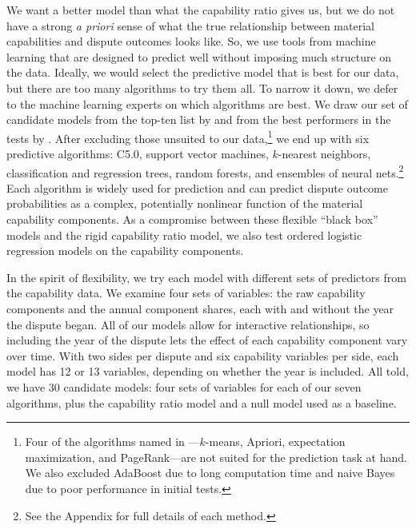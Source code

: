 We want a better model than what the capability ratio gives us, but we do not have a strong \emph{a priori} sense of what the true relationship between material capabilities and dispute outcomes looks like.
So, we use tools from machine learning that are designed to predict well without imposing much structure on the data.
Ideally, we would select the predictive model that is best for our data, but there are too many algorithms to try them all.
To narrow it down, we defer to the machine learning experts on which algorithms are best.
We draw our set of candidate models from the top-ten list by \citet{Wu:2007ev} and from the best performers in the tests by \citet{FernandezDelgado:2014ul}.
After excluding those unsuited to our data,\footnote{%
  Four of the algorithms named in \citet{Wu:2007ev}---$k$-means, Apriori, expectation maximization, and PageRank---are not suited for the prediction task at hand.
  We also excluded AdaBoost due to long computation time and naive Bayes due to poor performance in initial tests.
}
we end up with six predictive algorithms: C5.0, support vector machines, $k$-nearest neighbors, classification and regression trees, random forests, and ensembles of neural nets.\footnote{%
  See the Appendix for full details of each method.
}
Each algorithm is widely used for prediction and can predict dispute outcome probabilities as a complex, potentially nonlinear function of the material capability components.
As a compromise between these flexible ``black box'' models and the rigid capability ratio model, we also test ordered logistic regression models on the capability components.

In the spirit of flexibility, we try each model with different sets of predictors from the capability data.
We examine four sets of variables: the raw capability components and the annual component shares, each with and without the year the dispute began.
All of our models allow for interactive relationships, so including the year of
the dispute lets the effect of each capability component vary over time.
With two sides per dispute and six capability variables per side, each model has 12 or 13 variables, depending on whether the year is included.
All told, we have 30 candidate models: four sets of variables for each of our seven algorithms, plus the capability ratio model and a null model used as a baseline.

